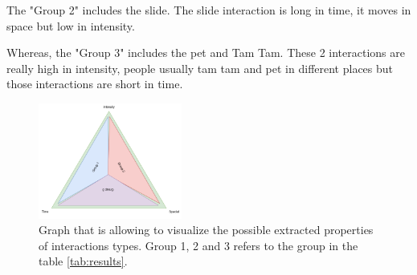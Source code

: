 The "Group 2" includes the slide. The slide interaction is long in time, it moves in space but low in intensity.

Whereas, the "Group 3" includes the pet and Tam Tam. These 2 interactions are really high in intensity, people usually tam tam and pet in different places but those interactions are short in time. 


\begin{figure}[h]
    \centering
    \includegraphics[width=0.42\textwidth]{Images/iop_triangle.png}
    \caption{Graph that is allowing to visualize the possible extracted properties of interactions types. Group 1, 2 and 3 refers to the group in the table \ref{tab:results}.}
    
    \vspace{-0.5cm}
    \label{fig:interaction_type_triangle}
    \vspace{0.2cm}
\end{figure}